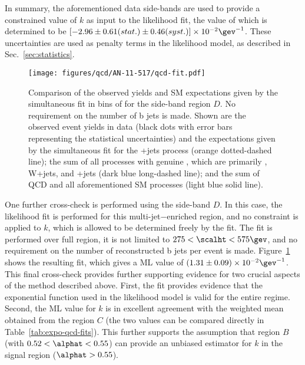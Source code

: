 In summary, the aforementioned data side-bands are used to provide a
constrained value of $k$ as input to the likelihood fit, the value of
which is determined to be $[ -2.96 \pm 0.61 (stat.) \pm 0.46 (syst.)
] \times 10^{-2}\gev^{-1}$. These uncertainties are used as penalty
terms in the likelihood model, as described in
Sec.~\ref{sec:statistics}.

\begin{figure}[!h]
  \begin{center}
    \texttt{[image: figures/qcd/AN-11-517/qcd-fit.pdf]}
    \caption{Comparison of the observed yields and SM expectations
      given by the simultaneous fit in bins of \scalht for the
      side-band region $D$. No requirement on the number of b jets is
      made. Shown are the observed event yields in data (black dots
      with error bars representing the statistical uncertainties) and
      the expectations given by the simultaneous fit for the
      \znunu+jets process (orange dotted-dashed line); the sum of all
      processes with genuine \met, which are primarily \ttbar, W+jets,
      and \znunu+jets (dark blue long-dashed line); and the sum of QCD
      and all aforementioned SM processes (light blue solid line).}
    \label{fig:qcd-fit}
  \end{center}
\end{figure}

One further cross-check is performed using the side-band $D$. In this
case, the likelihood fit is performed for this multi-jet$-$enriched
region, and no constraint is applied to $k$, which is allowed to be
determined freely by the fit. The fit is performed over full \scalht
region, \ie it is not limited to $275 < \scalht < 575\gev$, and no
requirement on the number of reconstructed b jets per event is
made. Figure~\ref{fig:qcd-fit} shows the resulting fit, which gives a
ML value of $(1.31\pm0.09) \times 10^{-2}\gev^{-1}$.
This final cross-check provides further supporting evidence for two
crucial aspects of the method described above. First, the fit provides
evidence that the exponential function used in the likelihood model is
valid for the entire \scalht regime.
Second, the ML value for $k$ is in excellent agreement with the
weighted mean obtained from the region $C$ (the two values can be
compared directly in Table~\ref{tab:expo-qcd-fits}). This further
supports the assumption that region $B$ (with $0.52 < \alphat < 0.55$)
can provide an unbiased estimator for $k$ in the signal region
($\alphat > 0.55$).

